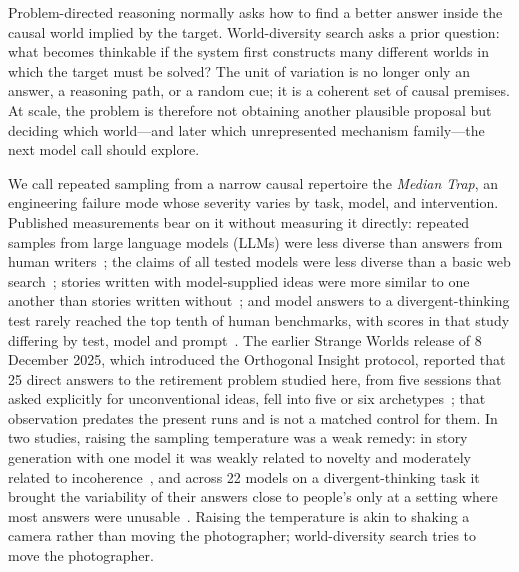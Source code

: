 \documentclass[11pt,a4paper]{article}
\begin{document}
Problem-directed reasoning normally asks how to find a better answer inside the causal world implied by the target. World-diversity search asks a prior question: what becomes thinkable if the system first constructs many different worlds in which the target must be solved? The unit of variation is no longer only an answer, a reasoning path, or a random cue; it is a coherent set of causal premises. At scale, the problem is therefore not obtaining another plausible proposal but deciding which world---and later which unrepresented mechanism family---the next model call should explore.

We call repeated sampling from a narrow causal repertoire the \emph{Median Trap}, an engineering failure mode whose severity varies by task, model, and intervention. Published measurements bear on it without measuring it directly: repeated samples from large language models (LLMs) were less diverse than answers from human writers~\cite{zhang2025noveltybench}; the claims of all tested models were less diverse than a basic web search~\cite{wright2025}; stories written with model-supplied ideas were more similar to one another than stories written without~\cite{doshi2024}; and model answers to a divergent-thinking test rarely reached the top tenth of human benchmarks, with scores in that study differing by test, model and prompt~\cite{haase2025}. The earlier Strange Worlds release of 8 December 2025, which introduced the Orthogonal Insight protocol, reported that 25 direct answers to the retirement problem studied here, from five sessions that asked explicitly for unconventional ideas, fell into five or six archetypes~\cite{westerberg2025strangeworlds}; that observation predates the present runs and is not a matched control for them. In two studies, raising the sampling temperature was a weak remedy: in story generation with one model it was weakly related to novelty and moderately related to incoherence~\cite{peeperkorn2024temperature}, and across 22 models on a divergent-thinking task it brought the variability of their answers close to people's only at a setting where most answers were unusable~\cite{wenger2026homogeneous}. Raising the temperature is akin to shaking a camera rather than moving the photographer; world-diversity search tries to move the photographer.
\end{document}
